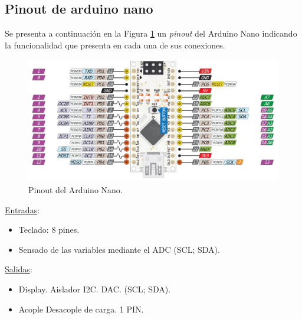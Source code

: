 \subsection{Pinout de arduino nano}
Se presenta a continuación en la Figura \ref{F:arduino_nano} un \textit{pinout} del Arduino Nano indicando la funcionalidad que presenta en cada una de sus conexiones.
\begin{figure}[H]
    \centering
    \includegraphics[width=\textwidth]{./imagenes/arduino_nano.jpg}
    \caption{Pinout del Arduino Nano.\cite{ArduinoNanoPinout}}
    \label{F:arduino_nano}
\end{figure}\par 
\underline{Entradas}:
\begin{itemize}
    \item Teclado: 8 pines. 
    \item Sensado de las variables mediante el ADC (SCL; SDA).
\end{itemize}\par 
\underline{Salidas}:
\begin{itemize}
    \item Display. Aislador I2C. DAC.  (SCL; SDA).
    \item Acople Desacople de carga. 1 PIN.
\end{itemize}\par 

